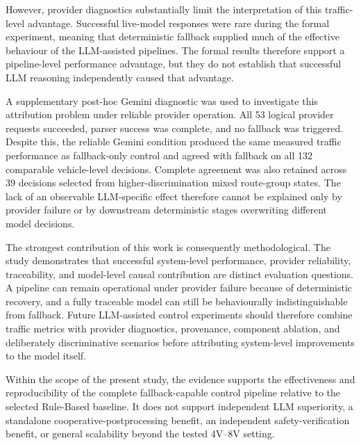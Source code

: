 \documentclass[letterpaper,10pt,conference]{ieeeconf}
\begin{document}
However, provider diagnostics substantially limit the interpretation of this traffic-level advantage. Successful live-model responses were rare during the formal experiment, meaning that deterministic fallback supplied much of the effective behaviour of the LLM-assisted pipelines. The formal results therefore support a pipeline-level performance advantage, but they do not establish that successful LLM reasoning independently caused that advantage.



A supplementary post-hoc Gemini diagnostic was used to investigate this attribution problem under reliable provider operation. All 53 logical provider requests succeeded, parser success was complete, and no fallback was triggered. Despite this, the reliable Gemini condition produced the same measured traffic performance as fallback-only control and agreed with fallback on all 132 comparable vehicle-level decisions. Complete agreement was also retained across 39 decisions selected from higher-discrimination mixed route-group states. The lack of an observable LLM-specific effect therefore cannot be explained only by provider failure or by downstream deterministic stages overwriting different model decisions.



The strongest contribution of this work is consequently methodological. The study demonstrates that successful system-level performance, provider reliability, traceability, and model-level causal contribution are distinct evaluation questions. A pipeline can remain operational under provider failure because of deterministic recovery, and a fully traceable model can still be behaviourally indistinguishable from fallback. Future LLM-assisted control experiments should therefore combine traffic metrics with provider diagnostics, provenance, component ablation, and deliberately discriminative scenarios before attributing system-level improvements to the model itself.



Within the scope of the present study, the evidence supports the effectiveness and reproducibility of the complete fallback-capable control pipeline relative to the selected Rule-Based baseline. It does not support independent LLM superiority, a standalone cooperative-postprocessing benefit, an independent safety-verification benefit, or general scalability beyond the tested 4V--8V setting.






\end{document}
